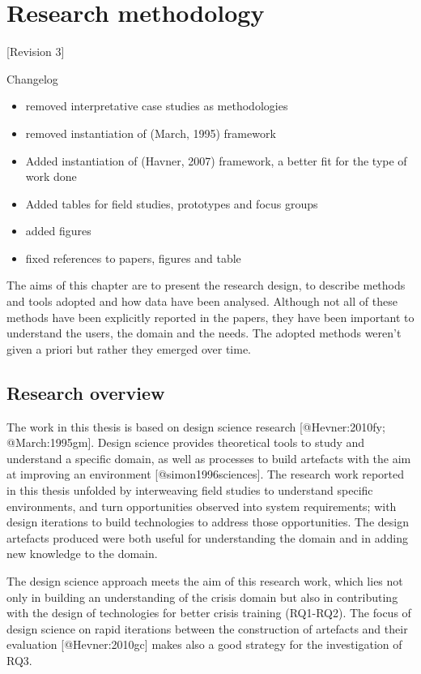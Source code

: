 \section{Research methodology}\label{research}

{[}Revision 3{]}

Changelog

\begin{itemize}
\itemsep1pt\parskip0pt
\item
  removed interpretative case studies as methodologies
\item
  removed instantiation of (March, 1995) framework
\item
  Added instantiation of (Havner, 2007) framework, a better fit for the
  type of work done
\item
  Added tables for field studies, prototypes and focus groups
\item
  added figures
\item
  fixed references to papers, figures and table
\end{itemize}

\reversemarginpar

The aims of this chapter are to present the research design, to describe
methods and tools adopted and how data have been analysed. Although not
all of these methods have been explicitly reported in the papers, they
have been important to understand the users, the domain and the needs.
The adopted methods weren't given a priori but rather they emerged over
time.

\subsection{Research overview}\label{research-overview}

The work in this thesis is based on design science research
{[}@Hevner:2010fy; @March:1995gm{]}. Design science provides theoretical
tools to study and understand a specific domain, as well as processes to
build artefacts with the aim at improving an environment
{[}@simon1996sciences{]}. The research work reported in this thesis
unfolded by interweaving field studies to understand specific
environments, and turn opportunities observed into system requirements;
with design iterations to build technologies to address those
opportunities. The design artefacts produced were both useful for
understanding the domain and in adding new knowledge to the domain.

The design science approach meets the aim of this research work, which
lies not only in building an understanding of the crisis domain but also
in contributing with the design of technologies for better crisis
training (RQ1-RQ2). The focus of design science on rapid iterations
between the construction of artefacts and their evaluation
{[}@Hevner:2010gc{]} makes also a good strategy for the investigation of
RQ3.

